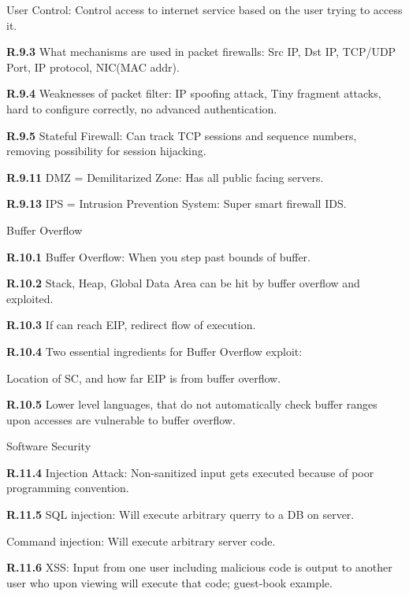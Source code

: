\documentclass[8pt]{extreport}
\begin{document}
User Control: Control access to internet service based on the user trying to
access it.

{\bf R.9.3}
What mechanisms are used in packet firewalls: Src IP, Dst IP, TCP/UDP Port, IP
protocol, NIC(MAC addr).


{\bf R.9.4}
Weaknesses of packet filter: IP spoofing attack, Tiny fragment attacks, hard to
configure correctly, no advanced authentication.


{\bf R.9.5}
Stateful Firewall: Can track TCP sessions and sequence numbers, removing
possibility for session hijacking.

{\bf R.9.11}
DMZ = Demilitarized Zone: Has all public facing servers.

{\bf R.9.13}
IPS = Intrusion Prevention System: Super smart firewall IDS.



{\Huge Buffer Overflow}

{\bf R.10.1}
Buffer Overflow: When you step past bounds of buffer. 

{\bf R.10.2}
Stack, Heap, Global Data Area can be hit by buffer overflow and exploited.

{\bf R.10.3}
If can reach EIP, redirect flow of execution.

{\bf R.10.4} Two essential ingredients for Buffer Overflow exploit:

Location of SC, and how far EIP is from buffer overflow.

{\bf R.10.5}
Lower level languages, that do not automatically check buffer ranges upon
accesses are vulnerable to buffer overflow.







{\Huge Software Security}

{\bf R.11.4}
Injection Attack: Non-sanitized input gets executed because of poor programming
convention.

{\bf R.11.5}
SQL injection: Will execute arbitrary querry to a DB on server.

Command injection: Will execute arbitrary server code.

{\bf R.11.6}
XSS: Input from one user including malicious code is output to another user who
upon viewing will execute that code; guest-book example.
\end{document}
